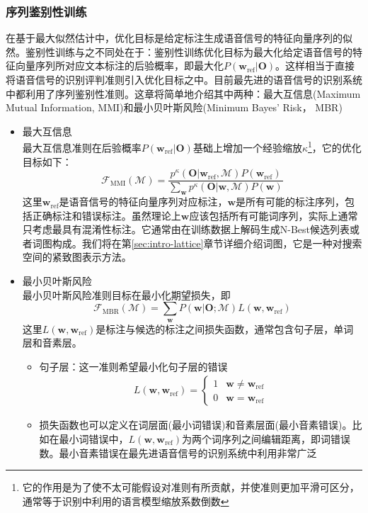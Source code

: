 \subsubsection{序列鉴别性训练}
在基于最大似然估计中，优化目标是给定标注生成语音信号的特征向量序列的似然。鉴别性训练与之不同处在于：鉴别性训练优化目标为最大化给定语音信号的特征向量序列所对应文本标注的后验概率，即最大化$P(\mathbf{w}_{\text{ref}}|\mathbf{O})$。这样相当于直接将语音信号的识别评判准则引入优化目标之中。目前最先进的语音信号的识别系统中都利用了序列鉴别性准则。这章将简单地介绍其中两种：最大互信息(Maximum Mutual Information, MMI)和最小贝叶斯风险(Minimum Bayes' Risk， MBR)
\begin{itemize}
    \item 最大互信息 \\
    最大互信息准则在后验概率$P(\mathbf{w}_{\text{ref}}|\mathbf{O})$基础上增加一个经验缩放$\kappa$\footnote{它的作用是为了使不太可能假设对准则有所贡献，并使准则更加平滑可区分，通常等于识别中利用的语言模型缩放系数倒数}，它的优化目标如下：
    \begin{equation}
        \mathcal{F}_{\text{MMI}}(\mathcal{M})=\frac{p^{\kappa}(\mathbf{O}|\mathbf{w}_{\text{ref}},\mathcal{M})P(\mathbf{w}_{\text{ref}})}{\sum_{\mathbf{w}}p^{\kappa}(\mathbf{O}|\mathbf{w},\mathcal{M})P(\mathbf{w})}
    \end{equation}
    这里$\mathbf{w}_{\text{ref}}$是语音信号的特征向量序列对应标注，$\mathbf{w}$是所有可能的标注序列，包括正确标注和错误标注。虽然理论上$\mathbf{w}$应该包括所有可能词序列，实际上通常只考虑最具有混淆性标注。它通常由在训练数据上解码生成N-Best候选列表或者词图构成。我们将在第\ref{sec:intro-lattice}章节详细介绍词图，它是一种对搜索空间的紧致图表示方法。
    \item 最小贝叶斯风险 \\
    最小贝叶斯风险准则目标在最小化期望损失，即
    \begin{equation}
        \mathcal{F}_{\text{MBR}}(\mathcal{M})=\sum_{\mathbf{w}}P(\mathbf{w}|\mathbf{O};\mathcal{M})L(\mathbf{w},\mathbf{w}_{\text{ref}})
    \end{equation}
    这里$L(\mathbf{w},\mathbf{w}_{\text{ref}})$是标注与候选的标注之间损失函数，通常包含句子层，单词层和音素层。
    \begin{itemize}
        \item 句子层：这一准则希望最小化句子层的错误
        \begin{eqnarray}
            L(\mathbf{w},\mathbf{w}_{\text{ref}})=
            \begin{cases}
                1& \mathbf{w} \ne \mathbf{w}_{\text{ref}} \\
                0& \mathbf{w} = \mathbf{w}_{\text{ref}}
            \end{cases}
        \end{eqnarray}
        \item 损失函数也可以定义在词层面(最小词错误)和音素层面(最小音素错误)。比如在最小词错误中，$L(\mathbf{w},\mathbf{w}_{\text{ref}})$为两个词序列之间编辑距离，即词错误数。最小音素错误在最先进语音信号的识别系统中利用非常广泛~\cite{povey2005discriminative}
    \end{itemize}
\end{itemize}

